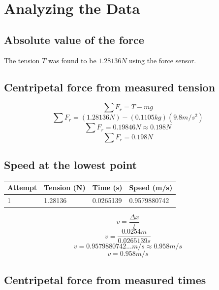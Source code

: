 \documentclass[11pt, letterpaper, includehead]{article}
\begin{document}
\section{Analyzing the Data}
\subsection{Absolute value of the force}
The tension $T$ was found to be $1.28136N$ using the force sensor.

\subsection{Centripetal force from measured tension}
\begin{center}
\end{center}
$$\sum F_r = T - mg$$
$$\sum F_r = (1.28136N) - (0.1105 kg)(9.8 m/s^2)$$
$$\sum F_r = 0.19846N \approx 0.198N$$
$$\boxed{\sum F_r = 0.198N}$$

\subsection{Speed at the lowest point}
\begin{center} 
  \begin{tabular}{|  m{1.5cm} | m{3.2cm} | m{3.2cm} | m{3.2cm} | } 
    \hline
    \textbf{Attempt} & \textbf{Tension (N)} & \textbf{Time (s)} & \textbf{Speed (m/s)} \\ 
    \hline
    1 & 1.28136 & 0.0265139 & 0.9579880742 \\ 
    \hline
  \end{tabular} 
\end{center}

$$v = \frac{\Delta x}{t}$$
$$v = \frac{0.0254 m}{0.0265139s}$$
$$v = 0.9579880742...m/s \approx 0.958 m/s$$
$$\boxed{v = 0.958 m/s}$$

\subsection{Centripetal force from measured times}
\end{document}

